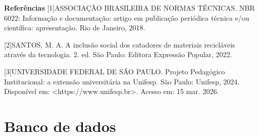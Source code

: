 \documentclass[12pt,openright,oneside,a4paper]{report}
\begin{document}
\vspace{0.7cm}
\noindent
\textbf{Referências}
[1]ASSOCIAÇÃO BRASILEIRA DE NORMAS TÉCNICAS. NBR 6022: Informação e documentação: artigo em
publicação periódica técnica e/ou científica: apresentação. Rio de Janeiro, 2018.

[2]SANTOS, M. A. A inclusão social dos catadores de materiais recicláveis através da tecnologia. 2. ed. São
Paulo: Editora Expressão Popular, 2022.

[3]UNIVERSIDADE FEDERAL DE SÃO PAULO. Projeto Pedagógico Institucional: a extensão universitária na
Unifesp. São Paulo: Unifesp, 2024. Disponível em: <https://www.unifesp.br>. Acesso em: 15 mar. 2026.

\vspace{0.7cm}
\chapter{Banco de dados}
\end{document}
